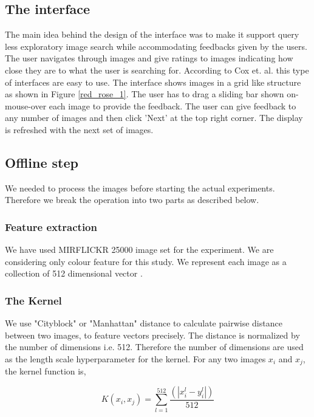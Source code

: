 \documentclass[english]{tktltiki}
\begin{document}
\subsection{The interface}

The main idea behind the design of the interface was to make it support query less exploratory image search while accommodating feedbacks given by the users. The user navigates through images and give ratings to images indicating how close they are to what the user is searching for. According to Cox et. al. \cite{pichunter} this type of interfaces are easy to use. The interface shows images in a grid like structure as shown in Figure \ref{red_rose_1}. The user has to drag a sliding bar shown on-mouse-over each image to provide the feedback. The user can give feedback to any number of images and then click 'Next' at the top right corner. The display is refreshed with the next set of images.


\subsection{Offline step}

We needed to process the images before starting the actual experiments. Therefore we break the operation into two parts as described below.

\subsubsection{Feature extraction}

We have used MIRFLICKR 25000 \cite{mirflickr} image set for the experiment. We are considering only colour feature for this study. We represent each image as a collection of 512 dimensional vector \cite{imse}.

\subsubsection{The Kernel}

We use "Cityblock" or "Manhattan" distance to calculate pairwise distance between two images, to feature vectors precisely. The distance is normalized by the number of dimensions i.e. 512. Therefore the number of dimensions are used as the length scale hyperparameter for the kernel. For any two images $x_i$ and $x_j$, the kernel function is,

\begin{equation}
K(x_i, x_j) = \sum_{l = 1}^{512}\frac{(|x_i^l - y_i^l|)} {512}
\end{equation}
\end{document}
